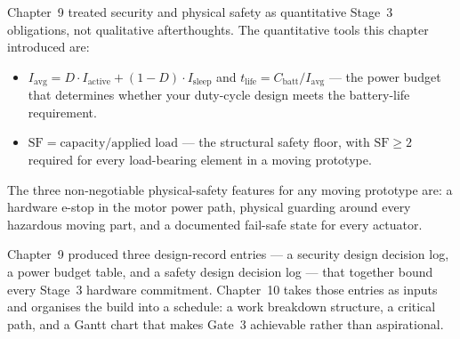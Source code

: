 Chapter~9 treated security and physical safety as quantitative Stage~3
obligations, not qualitative afterthoughts.
The quantitative tools this chapter introduced are:
\begin{itemize}
  \item $I_{\text{avg}} = D \cdot I_{\text{active}} + (1-D) \cdot I_{\text{sleep}}$
        and $t_{\text{life}} = C_{\text{batt}} / I_{\text{avg}}$ --- the
        power budget that determines whether your duty-cycle design meets the
        battery-life requirement.
  \item $\mathrm{SF} = \text{capacity} / \text{applied load}$ --- the structural
        safety floor, with $\mathrm{SF} \geq 2$ required for every load-bearing
        element in a moving prototype.
\end{itemize}

The three non-negotiable physical-safety features for any moving prototype are:
a hardware e-stop in the motor power path, physical guarding around every
hazardous moving part, and a documented fail-safe state for every actuator.

Chapter~9 produced three design-record entries --- a security design decision
log, a power budget table, and a safety design decision log --- that together
bound every Stage~3 hardware commitment.
Chapter~10 takes those entries as inputs and organises the build into a schedule:
a work breakdown structure, a critical path, and a Gantt chart that makes
Gate~3 achievable rather than aspirational.
